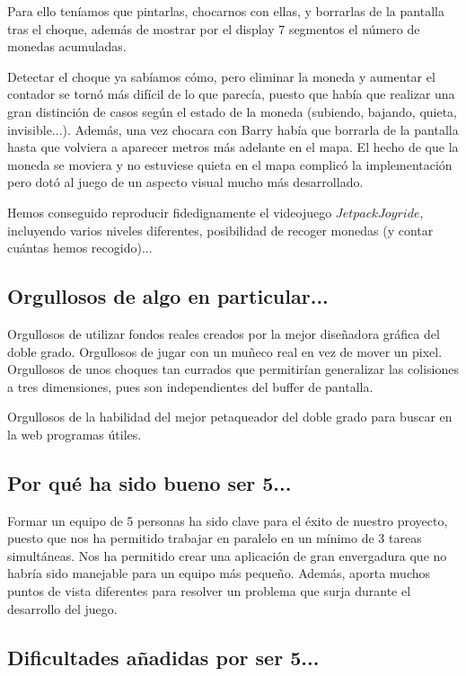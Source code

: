 \documentclass[11pt, a4paper, spanish, openright, twoside]{book}
\begin{document}
Para ello teníamos que pintarlas, chocarnos con ellas, y borrarlas de la pantalla tras el choque, además de mostrar por el display 7 segmentos el número de monedas acumuladas.

Detectar el choque ya sabíamos cómo, pero eliminar la moneda y aumentar el contador se tornó más difícil de lo que parecía, puesto que había que realizar una gran distinción de casos según el estado de la moneda (subiendo, bajando, quieta, invisible...). Además, una vez chocara con Barry había que borrarla de la pantalla hasta que volviera a aparecer metros más adelante en el mapa. El hecho de que la moneda se moviera y no estuviese quieta en el mapa complicó la implementación pero dotó al juego de un aspecto visual mucho más desarrollado.



Hemos conseguido reproducir fidedignamente el videojuego $Jetpack Joyride$, incluyendo varios niveles diferentes, posibilidad de recoger monedas (y contar cuántas hemos recogido)...

\subsection{Orgullosos de algo en particular...}

Orgullosos de utilizar fondos reales creados por la mejor diseñadora gráfica del doble grado. Orgullosos de jugar con un muñeco real en vez de mover un pixel. Orgullosos de unos choques tan
 currados que permitirían generalizar las colisiones a tres dimensiones, pues son independientes del buffer de pantalla. 

Orgullosos de la habilidad del mejor petaqueador del doble grado para buscar en la web programas útiles. 

\subsection{Por qué ha sido bueno ser 5...}
Formar un equipo de 5 personas ha sido clave para el éxito de nuestro proyecto, puesto que nos ha permitido trabajar en paralelo en un mínimo de 3 tareas simultáneas. Nos ha 
permitido crear una aplicación de gran envergadura que no habría sido manejable para un equipo más pequeño.
Además, aporta muchos puntos de vista diferentes para resolver un problema que surja durante el desarrollo del juego.


\subsection{Dificultades añadidas por ser 5...}
\end{document}

